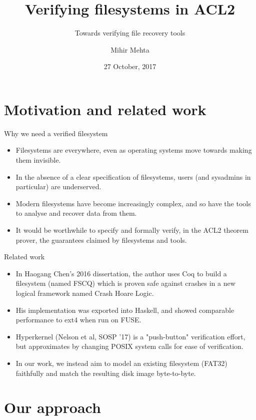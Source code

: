 \documentclass{beamer}
\title{Verifying filesystems in ACL2}
\subtitle{Towards verifying file recovery tools}
\author{Mihir Mehta}
\institute{
  Department of Computer Science\\
  University of Texas at Austin\\[1ex]
  \texttt{mihir@cs.utexas.edu}
}
\date{27 October, 2017}
\begin{document}
\begin{frame}[plain]
  \titlepage
\end{frame}


\section{Motivation and related work}

\begin{frame}{Why we need a verified filesystem}
  \begin{itemize}
  \item Filesystems are everywhere, even as operating systems move
    towards making them invisible.
  \item In the absence of a clear specification of filesystems, users
    (and sysadmins in particular) are underserved.
  \item Modern filesystems have become increasingly complex, and so
    have the tools to analyse and recover data from them.
  \item It would be worthwhile to specify and formally verify, in the
    ACL2 theorem prover, the guarantees claimed by filesystems and tools.
  \end{itemize}
\end{frame}

\begin{frame}{Related work}
  \begin{itemize}
  \item In Haogang Chen's 2016 dissertation, the author uses Coq to
    build a filesystem (named FSCQ) which is proven safe against
    crashes in a new logical framework named Crash Hoare Logic.
  \item His implementation was exported into Haskell, and showed
    comparable performance to ext4 when run on FUSE.
  \item Hyperkernel (Nelson et al, SOSP '17) is a "push-button"
    verification effort, but approximates by changing POSIX system
    calls for ease of verification.
  \item In our work, we instead aim to model an existing filesystem (FAT32)
    faithfully and match the resulting disk image byte-to-byte.
  \end{itemize}
\end{frame}

\section{Our approach}
\end{document}
